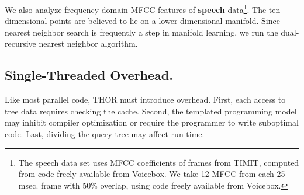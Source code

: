 \documentclass[twoside,leqno,twocolumn]{article}
\newcommand{\mysub}[1]{\subsection{#1.}}
\newcommand{\defterm}[1]{{\bf #1}}
\begin{document}
We also analyze frequency-domain MFCC features of \defterm{speech} data\footnote{The speech data set uses MFCC coefficients of frames from TIMIT, computed from code freely available from Voicebox.
   We take 12 MFCC from each 25 msec. frame with 50\% overlap, using code freely available from Voicebox.}.
The ten-dimensional points are believed to lie on a lower-dimensional manifold.
Since nearest neighbor search is frequently a step in manifold learning, we run the dual-recursive nearest neighbor algorithm.



\mysub{Single-Threaded Overhead}

Like most parallel code, THOR must introduce overhead.
First, each access to tree data requires checking the cache.
Second, the templated programming model may inhibit compiler optimization or require the programmer to write suboptimal code.
Last, dividing the query tree may affect run time.
\end{document}
